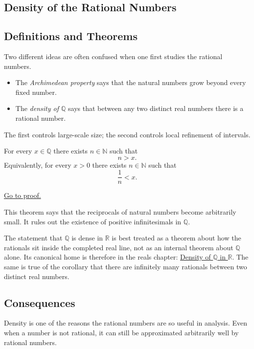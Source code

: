 
\subsection{Density of the Rational Numbers}
\label{sec:density-q}

\subsection{Definitions and Theorems}

Two different ideas are often confused when one first studies the rational numbers.

\begin{itemize}
  \item The \emph{Archimedean property} says that the natural numbers grow beyond every fixed
  number.
  \item The \emph{density of $\mathbb{Q}$} says that between any two distinct real numbers there is a
  rational number.
\end{itemize}

The first controls large-scale size; the second controls local refinement of intervals.

\begin{theorem}
\label{thm:archimedean-q}
For every $x\in\mathbb{Q}$ there exists $n\in\mathbb{N}$ such that
\[
n>x.
\]
Equivalently, for every $x>0$ there exists $n\in\mathbb{N}$ such that
\[
\frac{1}{n}<x.
\]
\end{theorem}

\begin{remark*}[Proof]
\hyperref[prf:archimedean-q]{Go to proof.}
\end{remark*}

\begin{remark}
This theorem says that the reciprocals of natural numbers become arbitrarily small.  It rules out the
existence of positive infinitesimals in $\mathbb{Q}$.
\end{remark}

\begin{remark}
The statement that $\mathbb{Q}$ is dense in $\mathbb{R}$ is best treated as a
theorem about how the rationals sit inside the completed real line, not as an
internal theorem about $\mathbb{Q}$ alone.  Its canonical home is therefore in
the reals chapter:
\hyperref[thm:q-dense-in-r]{Density of $\mathbb{Q}$ in $\mathbb{R}$}.  The
same is true of the corollary that there are infinitely many rationals between
two distinct real numbers.
\end{remark}

\subsection{Consequences}

\begin{remark}
Density is one of the reasons the rational numbers are so useful in analysis.  Even when a number is
not rational, it can still be approximated arbitrarily well by rational numbers.
\end{remark}

